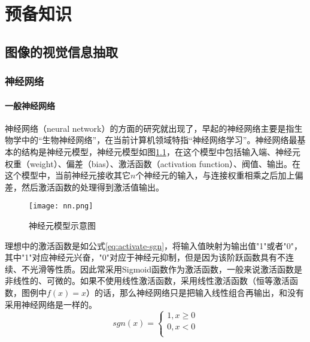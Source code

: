 
\chapter{预备知识}
\label{ch:pre}



\section{图像的视觉信息抽取}



\subsection{神经网络}

\subsubsection{一般神经网络}
神经网络（neural network）的方面的研究就出现了，早起的神经网络主要是指生物学中的``生物神经网络''，在当前计算机领域特指``神经网络学习''。神经网络最基本的结构是神经元模型，神经元模型如图\ref{fig:nn-example}，在这个模型中包括输入端、神经元权重（weight）、偏差（bias）、激活函数（activation function）、阀值、输出。在这个模型中，当前神经元接收其它$n$个神经元的输入，与连接权重相乘之后加上偏差，然后激活函数的处理得到激活值输出。
\begin{figure}[htpb]
	\centering
	\texttt{[image: nn.png]}
    \caption{神经元模型示意图}
	\vspace*{-3.5mm}
	\label{fig:nn-example}
\end{figure}
理想中的激活函数是如公式\ref{eq:activate-sgn}，将输入值映射为输出值"1"或者"0"，其中"1"对应神经元兴奋，"0"对应于神经元抑制，但是因为该阶跃函数具有不连续、不光滑等性质。因此常采用Sigmoid函数作为激活函数，一般来说激活函数是非线性的、可微的。如果不使用线性激活函数，采用线性激活函数（恒等激活函数，图例中$f(x) = x$）的话，那么神经网络只是把输入线性组合再输出，和没有采用神经网络是一样的。
\begin{equation}\label{eq:activate-sgn}
    sgn(x)=\left\{
    \begin{aligned}
    1, x\geq 0 \\
    0, x<0 \\
    \end{aligned}
    \right.
\end{equation}
